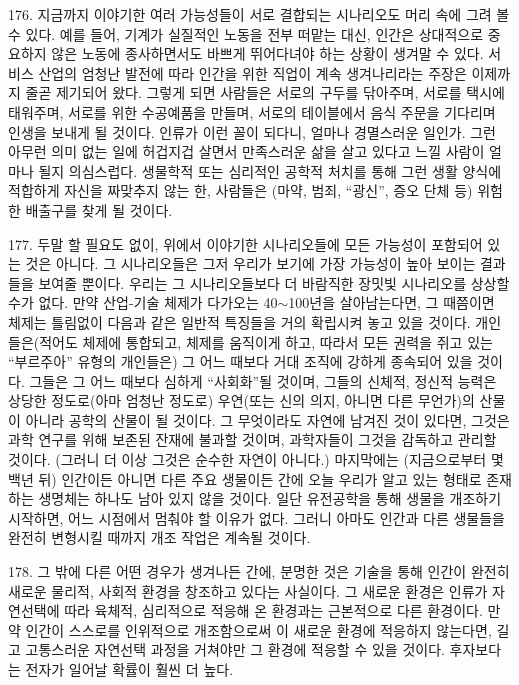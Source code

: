 \documentclass[11pt,a4paper]{article}
\begin{document}
\begin{multicols}{2}
176. 지금까지 이야기한 여러 가능성들이 서로 결합되는 시나리오도 머리 속에 그려 볼 수 있다. 예를  들어, 기계가 실질적인 노동을 전부 떠맡는 대신, 인간은 상대적으로 중요하지 않은 노동에 종사하면서도 바쁘게 뛰어다녀야 하는 상황이 생겨말 수 있다. 서비스 산업의 엄청난 발전에 따라 인간을 위한 직업이 계속 생겨나리라는 주장은 이제까지 줄곧 제기되어 왔다. 그렇게 되면 사람들은 서로의 구두를 닦아주며,  서로를 택시에 태워주며, 서로를 위한 수공예품을 만들며, 서로의 테이블에서 음식 주문을 기다리며  인생을 보내게 될 것이다. 인류가 이런 꼴이 되다니, 얼마나 경멸스러운 일인가. 그런 아무런 의미 없는  일에 허겁지겁 살면서 만족스러운 삶을 살고 있다고 느낄 사람이 얼마나 될지 의심스럽다. 생물학적 또는  심리적인 공학적 처치를 통해 그런 생활 양식에 적합하게 자신을 짜맞추지 않는 한, 사람들은 (마약, 범죄, “광신”, 증오 단체 등) 위험한 배출구를 찾게 될 것이다.  


177. 두말 할 필요도 없이, 위에서 이야기한 시나리오들에 모든 가능성이 포함되어 있는 것은 아니다. 그  시나리오들은 그저 우리가 보기에 가장 가능성이 높아 보이는 결과들을 보여줄 뿐이다. 우리는 그  시나리오들보다 더 바람직한 장밋빛 시나리오를 상상할 수가 없다. 만약 산업-기술 체제가 다가오는  40${\sim}$100년을 살아남는다면, 그 때쯤이면 체제는 틀림없이 다음과 같은 일반적 특징들을 거의 확립시켜 놓고 있을 것이다. 개인들은(적어도 체제에 통합되고, 체제를 움직이게 하고, 따라서 모든 권력을 쥐고  있는 “부르주아” 유형의 개인들은) 그 어느 때보다 거대 조직에 강하게 종속되어 있을 것이다. 그들은 그  어느 때보다 심하게 “사회화”될 것이며, 그들의 신체적, 정신적 능력은 상당한 정도로(아마 엄청난  정도로) 우연(또는 신의 의지, 아니면 다른 무언가)의 산물이 아니라 공학의 산물이 될 것이다. 그  무엇이라도 자연에 남겨진 것이 있다면, 그것은 과학 연구를 위해 보존된 잔재에 불과할 것이며,  과학자들이 그것을 감독하고 관리할 것이다. (그러니 더 이상 그것은 순수한 자연이 아니다.) 마지막에는 (지금으로부터 몇백년 뒤) 인간이든 아니면 다른 주요 생물이든 간에 오늘 우리가 알고 있는 형태로  존재하는 생명체는 하나도 남아 있지 않을 것이다. 일단 유전공학을 통해 생물을 개조하기 시작하면, 어느 시점에서 멈춰야 할 이유가 없다. 그러니 아마도 인간과 다른 생물들을 완전히 변형시킬 때까지 개조 작업은 계속될 것이다. 


178. 그 밖에 다른 어떤 경우가 생겨나든 간에, 분명한 것은 기술을 통해 인간이 완전히 새로운 물리적,  사회적 환경을 창조하고 있다는 사실이다. 그 새로운 환경은 인류가 자연선택에 따라 육체적, 심리적으로  적응해 온 환경과는 근본적으로 다른 환경이다. 만약 인간이 스스로를 인위적으로 개조함으로써 이  새로운 환경에 적응하지 않는다면, 길고 고통스러운 자연선택 과정을 거쳐야만 그 환경에 적응할 수 있을  것이다. 후자보다는 전자가 일어날 확률이 훨씬 더 높다.  



\end{multicols}
\end{document}
